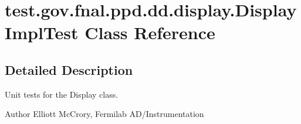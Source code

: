 \hypertarget{classtest_1_1gov_1_1fnal_1_1ppd_1_1dd_1_1display_1_1DisplayImplTest}{\section{test.\-gov.\-fnal.\-ppd.\-dd.\-display.\-Display\-Impl\-Test Class Reference}
\label{classtest_1_1gov_1_1fnal_1_1ppd_1_1dd_1_1display_1_1DisplayImplTest}
}


\subsection{Detailed Description}
Unit tests for the Display class.

\begin{DoxyAuthor}{Author}
Elliott Mc\-Crory, Fermilab A\-D/\-Instrumentation 
\end{DoxyAuthor}
